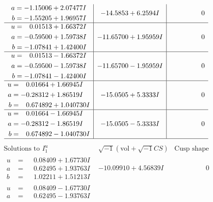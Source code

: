 \documentclass[1p]{elsarticle_modified}
\theoremstyle{definition}
\newcommand{\I}{\sqrt{-1}}
\begin{document}
$$\begin{array}{c|c|c}
\begin{aligned}
a &= -1.15006 + 2.07477 I \\
b &= -1.55205 + 1.96957 I\end{aligned}
 & -14.5853 + 6.2594 I & \phantom{-0.000000 } 0 \\ \hline\begin{aligned}
u &= \phantom{-}0.01513 + 1.66372 I \\
a &= -0.59500 + 1.59738 I \\
b &= -1.07841 + 1.42400 I\end{aligned}
 & -11.65700 + 1.95959 I & \phantom{-0.000000 } 0 \\ \hline\begin{aligned}
u &= \phantom{-}0.01513 - 1.66372 I \\
a &= -0.59500 - 1.59738 I \\
b &= -1.07841 - 1.42400 I\end{aligned}
 & -11.65700 - 1.95959 I & \phantom{-0.000000 } 0 \\ \hline\begin{aligned}
u &= \phantom{-}0.01664 + 1.66945 I \\
a &= -0.28312 + 1.86519 I \\
b &= \phantom{-}0.674892 + 1.040730 I\end{aligned}
 & -15.0505 + 5.3333 I & \phantom{-0.000000 } 0 \\ \hline\begin{aligned}
u &= \phantom{-}0.01664 - 1.66945 I \\
a &= -0.28312 - 1.86519 I \\
b &= \phantom{-}0.674892 - 1.040730 I\end{aligned}
 & -15.0505 - 5.3333 I & \phantom{-0.000000 } 0\\
 \hline 
 \end{array}$$\newpage$$\begin{array}{c|c|c}  
\text{Solutions to }I^u_{1}& \I (\text{vol} + \sqrt{-1}CS) & \text{Cusp shape}\\
 \hline 
\begin{aligned}
u &= \phantom{-}0.08409 + 1.67730 I \\
a &= \phantom{-}0.62495 + 1.93763 I \\
b &= \phantom{-}1.02211 + 1.51213 I\end{aligned}
 & -10.09910 + 4.56839 I & \phantom{-0.000000 } 0 \\ \hline\begin{aligned}
u &= \phantom{-}0.08409 - 1.67730 I \\
a &= \phantom{-}0.62495 - 1.93763 I \\

\end{aligned}
\end{array}$$
\end{document}
